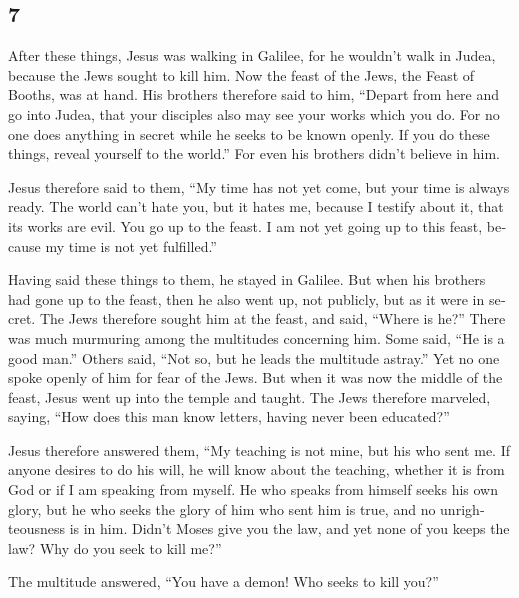 \begin{paracol}{2}
\begin{otherlanguage}{english}
\hypertarget{section-13}{%
\section{7}\label{section-13}}

 After these things, Jesus was walking in Galilee, for he
wouldn't walk in Judea, because the Jews sought to kill him.
 Now the feast of the Jews, the Feast of Booths, was at
hand.  His brothers therefore said to him, ``Depart from
here and go into Judea, that your disciples also may see your works
which you do.  For no one does anything in secret while he
seeks to be known openly. If you do these things, reveal yourself to the
world.''  For even his brothers didn't believe in him.

 Jesus therefore said to them, ``My time has not yet come,
but your time is always ready.  The world can't hate you,
but it hates me, because I testify about it, that its works are evil.
 You go up to the feast. I am not yet going up to this
feast, because my time is not yet fulfilled.''

 Having said these things to them, he stayed in Galilee.
 But when his brothers had gone up to the feast, then he
also went up, not publicly, but as it were in secret. 
The Jews therefore sought him at the feast, and said, ``Where is he?''
 There was much murmuring among the multitudes concerning
him. Some said, ``He is a good man.'' Others said, ``Not so, but he
leads the multitude astray.''  Yet no one spoke openly of
him for fear of the Jews.  But when it was now the middle
of the feast, Jesus went up into the temple and taught. 
The Jews therefore marveled, saying, ``How does this man know letters,
having never been educated?''

 Jesus therefore answered them, ``My teaching is not
mine, but his who sent me.  If anyone desires to do his
will, he will know about the teaching, whether it is from God or if I am
speaking from myself.  He who speaks from himself seeks
his own glory, but he who seeks the glory of him who sent him is true,
and no unrighteousness is in him.  Didn't Moses give you
the law, and yet none of you keeps the law? Why do you seek to kill
me?''

 The multitude answered, ``You have a demon! Who seeks to
kill you?''


\end{otherlanguage}
\end{paracol}
